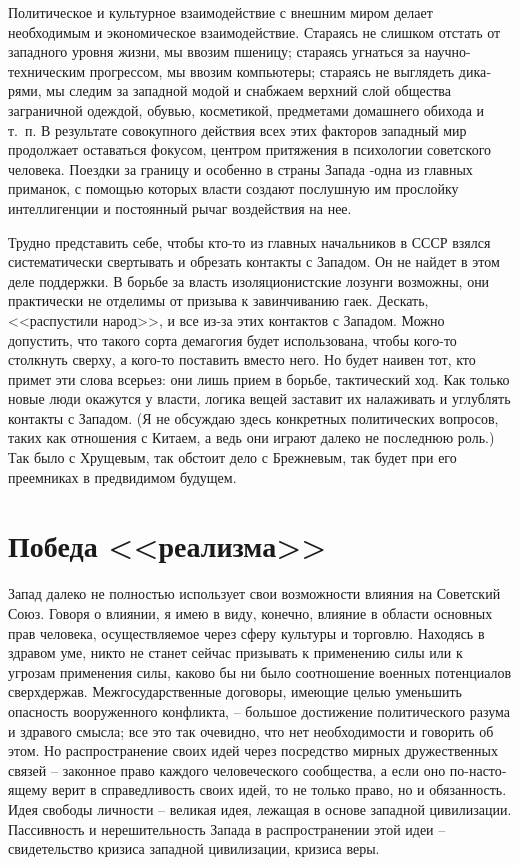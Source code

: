\documentclass{book}
\begin{document}
Политическое и культурное взаимодействие с внешним ми­ром делает необходимым и экономическое взаимодействие. Стараясь не слишком отстать от западного уровня жизни, мы ввозим пшеницу; стараясь угнаться за научно-техническим про­грессом, мы ввозим компьютеры; стараясь не выглядеть дика­рями, мы следим за западной модой и снабжаем верхний слой общества заграничной одеждой, обувью, косметикой, предме­тами домашнего обихода и т.~п. В результате совокупного действия всех этих факторов западный мир продолжает оста­ваться фокусом, центром притяжения в психологии советско­го человека. Поездки за границу и особенно в страны Запада -одна из главных приманок, с помощью которых власти со­здают послушную им прослойку интеллигенции и постоянный рычаг воздействия на нее.

Трудно представить себе, чтобы кто-то из главных начальни­ков в СССР взялся систематически свертывать и обрезать кон­такты с Западом. Он не найдет в этом деле поддержки. В борь­бе за власть изоляционистские лозунги возможны, они прак­тически не отделимы от призыва к завинчиванию гаек. Дескать, <<распустили народ>>, и все из-за этих контактов с Западом. Можно допустить, что такого сорта демагогия будет использована, чтобы кого-то столкнуть сверху, а кого-то поставить вместо него. Но будет наивен тот, кто примет эти слова все­рьез: они лишь прием в борьбе, тактический ход. Как только новые люди окажутся у власти, логика вещей заставит их нала­живать и углублять контакты с Западом. (Я не обсуждаю здесь конкретных политических вопросов, таких как отношения с Китаем, а ведь они играют далеко не последнюю роль.) Так бы­ло с Хрущевым, так обстоит дело с Брежневым, так будет при его преемниках в предвидимом будущем.


\section{Победа <<реализма>>}

Запад далеко не полностью использует свои возможности влияния на Советский Союз. Говоря о влиянии, я имею в виду, конечно, влияние в области основных прав человека, осуще­ствляемое через сферу культуры и торговлю. Находясь в здра­вом уме, никто не станет сейчас призывать к применению силы или к угрозам применения силы, каково бы ни было соотно­шение военных потенциалов сверхдержав. Межгосударствен­ные договоры, имеющие целью уменьшить опасность воору­женного конфликта, -- большое достижение политического ра­зума и здравого смысла; все это так очевидно, что нет необ­ходимости и говорить об этом. Но распространение своих идей через посредство мирных дружественных связей -- законное право каждого человеческого сообщества, а если оно по-насто­ящему верит в справедливость своих идей, то не только право, но и обязанность. Идея свободы личности -- великая идея, ле­жащая в основе западной цивилизации. Пассивность и нереши­тельность Запада в распространении этой идеи -- свидетельство кризиса западной цивилизации, 
кризиса веры.
\end{document}
